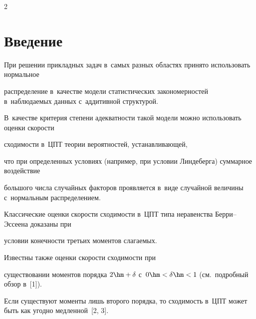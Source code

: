 





\vspace*{3pt}






\thispagestyle{headings}



\begin{multicols}{2}



\label{st\stat}



\section{Введение}





При решении прикладных задач в~самых разных областях принято использовать нормальное 

распределение в~качестве модели статистических закономерностей в~наблюдаемых данных с~аддитивной структурой. 

В~качестве критерия степени адекватности такой модели можно использовать оценки ско\-рости 

сходимости в~ЦПТ тео\-рии вероятностей, устанавливающей, 

что при определенных условиях (например, при условии Линдеберга) суммарное воздействие 

большого числа случайных факторов проявляется в~виде случайной величины с~нормальным распределением. 



Классические оценки скорости сходимости в~ЦПТ типа неравенства Бер\-ри--Эс\-се\-ена доказаны при 

условии конечности третьих моментов сла\-га\-емых. 



Известны также оценки ско\-рости сходимости при 

существовании моментов порядка $2\hm+\delta$ с~$0\hm<\delta\hm<1$ (см.\ подробный обзор в~[1]).

 Если существуют моменты лишь второго порядка, то сходимость в~ЦПТ может быть как угодно медленной~[2, 3]. 


\end{multicols}
